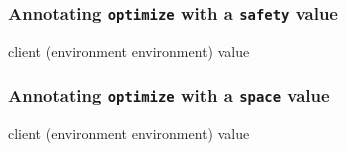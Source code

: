 
\subsubsection{Annotating \texttt{optimize} with a \texttt{safety} value}

{\footnotesize
{}
{client
 (environment environment)
  value}
}


\subsubsection{Annotating \texttt{optimize} with a \texttt{space} value}

{\footnotesize
{}
{client
 (environment environment)
  value}
}

